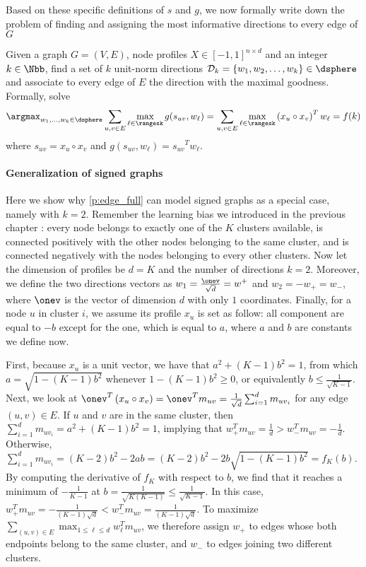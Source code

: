 Based on these specific definitions of $s$ and $g$, we now formally write down the problem of
finding and assigning the most informative directions to every edge of $G$
\begin{problem}[]
  \label{p:edge_full}
  Given a graph $G=(V, E)$, node profiles $X\in [-1, 1]^{n\times d}$ and an integer $k \in \Nbb$,
  find a set of $k$ unit-norm directions $\mathcal{D}_k = \{w_1, w_2, \ldots, w_k\} \in \dsphere$
  and associate to every edge of $E$ the direction with the maximal goodness. Formally, solve
  \begin{equation}
    \label{eq:edge_full}
    \argmax_{w_1,\ldots,w_k \in \dsphere}
    \sum_{u,v \in E} \max_{\ell \in \rangesk} g(s_{uv}, w_{\ell}) =
    \sum_{u,v \in E} \max_{\ell \in \rangesk} \left(x_u \circ x_v\right)^T w_{\ell} = f(k)
  \end{equation}
  where $s_{uv} = x_u \circ x_v$ and $g(s_{uv}, w_{\ell}) = {s_{uv}}^T w_{\ell}$.
\end{problem}


\paragraph{Generalization of signed graphs}
\label{par:generalization_of_signed_graphs}

Here we show why \autoref{p:edge_full} can model signed graphs as a special case, namely with $k=2$.
Remember the learning
bias we introduced in the previous chapter : every node belongs to
exactly one of the $K$ clusters available, is connected positively with the other nodes belonging to
the same cluster, and is connected negatively with the nodes belonging to every other clusters. Now
let the dimension of profiles be $d=K$ and the number of directions $k=2$. Moreover, we define the
two directions vectors as $w_1 = \frac{\onev}{\sqrt{d}} = w^+$ and $w_2 = -w_+ = w_-$, where
$\onev$ is the vector of dimension $d$ with only $1$ coordinates. Finally, for a node $u$ in
cluster $i$, we assume its profile $x_u$ is set as follow: all component are equal to $-b$ except
for the \ith{} one, which is equal to $a$, where $a$ and $b$ are constants we define now.

First, because $x_u$ is a unit vector, we have that $a^2 + (K-1)b^2=1$, from which $a =
\sqrt{1-(K-1)b^2}$ whenever $1-(K-1)b^2 \geq 0$, or equivalently $b \leq \frac{1}{\sqrt{K-1}}$.
Next, we look at $\onev^T\left(x_u \circ x_v\right) = \onev^T m_{uv} = \frac{1}{\sqrt{d}}
\sum_{i=1}^d m_{{uv}_i}$ for any edge $(u,v) \in E$. If $u$ and $v$ are in the same cluster, then
$\sum_{i=1}^d m_{{uv}_i} = a^2 + (K-1)b^2 = 1$, implying that $w_+^T m_{uv} = \frac{1}{d} > w_-^T
m_{uv} = -\frac{1}{d}$. Otherwise, $\sum_{i=1}^d m_{{uv}_i} = (K-2)b^2 - 2ab = (K-2)b^2 -
2b\sqrt{1-(K-1)b^2} = f_K(b)$. By computing the derivative of $f_K$ with respect to $b$, we find
that it reaches a minimum of $-\frac{1}{K-1}$ at $b = \frac{1}{\sqrt{K(K-1)}} \leq
\frac{1}{\sqrt{K-1}}$. In this case, $w_+^T m_{uv} = -\frac{1}{(K-1) \sqrt{d}} < w_-^T m_{uv} =
\frac{1}{(K-1) \sqrt{d}}$. To maximize $\sum_{(u,v)\in E} \max_{1 \leq \ell \leq d} w_\ell^T
m_{uv}$, we therefore assign $w_+$ to edges whose both endpoints belong to the same cluster, and
$w_-$ to edges joining two different clusters.

